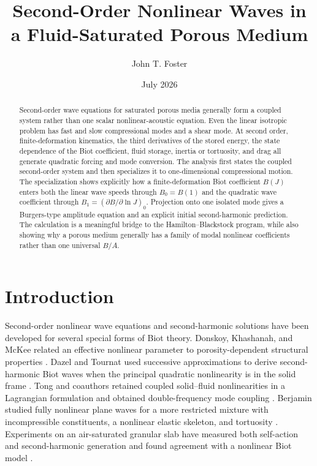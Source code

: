 \documentclass[11pt]{article}
\title{Second-Order Nonlinear Waves in a Fluid-Saturated Porous Medium}
\author{John T. Foster}
\date{July 2026}
\begin{document}
\maketitle

\begin{abstract}
Second-order wave equations for saturated porous media generally form a
coupled system rather than one scalar nonlinear-acoustic equation.  Even the
linear isotropic problem has fast and slow compressional modes and a shear
mode.  At second order, finite-deformation kinematics, the third derivatives of
the stored energy, the state dependence of the Biot coefficient, fluid storage,
inertia or tortuosity, and drag all generate quadratic forcing and mode
conversion.  The analysis first states the coupled second-order system and then
specializes it to one-dimensional compressional motion.  The specialization
shows explicitly how a finite-deformation Biot coefficient \(B(J)\) enters both
the linear wave speeds through \(B_0=B(1)\) and the quadratic wave coefficient
through \(B_1=(\partial B/\partial\ln J)_0\).  Projection onto one isolated
mode gives a Burgers-type amplitude equation and an explicit initial
second-harmonic prediction.  The calculation is a meaningful bridge to the
Hamilton--Blackstock program, while also showing why a porous medium generally
has a family of modal nonlinear coefficients rather than one universal
\(B/A\).
\end{abstract}

\section{Introduction}

Second-order nonlinear wave equations and second-harmonic solutions have been
developed for several special forms of Biot theory.  Donskoy, Khashanah, and
McKee related an effective nonlinear parameter to porosity-dependent
structural properties
\cite{donskoy1997}.  Dazel and Tournat used successive approximations to derive
second-harmonic Biot waves when the principal quadratic nonlinearity is in the
solid frame \cite{dazel2010}.  Tong and coauthors retained coupled solid--fluid
nonlinearities in a Lagrangian formulation and obtained double-frequency mode
coupling \cite{tong2017}.  Berjamin studied fully nonlinear plane waves for a
more restricted mixture with incompressible constituents, a nonlinear elastic
skeleton, and tortuosity \cite{berjamin2021}.  Experiments on an air-saturated
granular slab have measured both self-action and second-harmonic generation and
found agreement with a nonlinear Biot model \cite{legland2012}.
\end{document}
